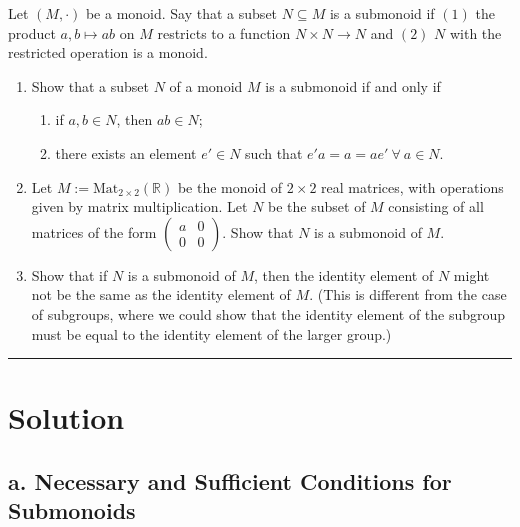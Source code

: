 \documentclass[12pt]{amsart}
\theoremstyle{definition}
\numberwithin{equation}{section}
\newcommand{\R}{\mathbb{R}}
\begin{document}
\begin{exercise}{2} 
    Let \((M, \cdot)\) be a monoid. Say that a subset \(N \subseteq M\) is a submonoid if \((1)\) the product \(a, b \mapsto ab\) on \(M\) restricts to a function \(N \times N \rightarrow N\) and \((2)\) \(N\) with the restricted operation is a monoid.
    
    \begin{enumerate}[label=\textbf{\alph*.}]
        \item Show that a subset \(N\) of a monoid \(M\) is a submonoid if and only if 
        \begin{enumerate}[label=(\roman*)]
            \item if \(a, b \in N\), then \(ab \in N\);
            \item there exists an element \(e' \in N\) such that \(e'a = a = ae' \ \forall \ a \in N\).
        \end{enumerate}
        
        \item Let \(M := \text{Mat}_{2 \times 2}(\R)\) be the monoid of \(2 \times 2\) real matrices, with operations given by matrix multiplication. Let \(N\) be the subset of \(M\) consisting of all matrices of the form \(\begin{pmatrix} a & 0 \\ 0 & 0 \end{pmatrix}\). Show that \(N\) is a submonoid of \(M\).
    
        \item Show that if \(N\) is a submonoid of \(M\), then the identity element of \(N\) might not be the same as the identity element of \(M\). (This is different from the case of subgroups, where we could show that the identity element of the subgroup must be equal to the identity element of the larger group.)
    \end{enumerate}
    
    \noindent\rule{\linewidth}{1pt}
    
    \section*{Solution}
    
    \subsection*{\textbf{a. Necessary and Sufficient Conditions for Submonoids}}
    

\end{exercise}
\end{document}
